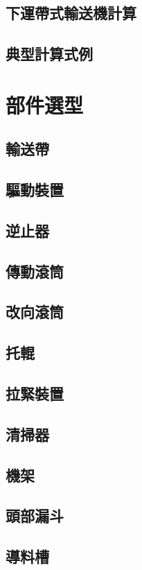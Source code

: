 \documentclass[UTF8]{ctexart}
\begin{document}
\subsection{下運帶式輸送機計算}
\subsection{典型計算式例}



\newpage
\section{部件選型}
\subsection{輸送帶}
\subsection{驅動裝置}
\subsection{逆止器}
\subsection{傳動滾筒}
\subsection{改向滾筒}
\subsection{托輥}
\subsection{拉緊裝置}
\subsection{清掃器}
\subsection{機架}
\subsection{頭部漏斗}
\subsection{導料槽}
\end{document}
